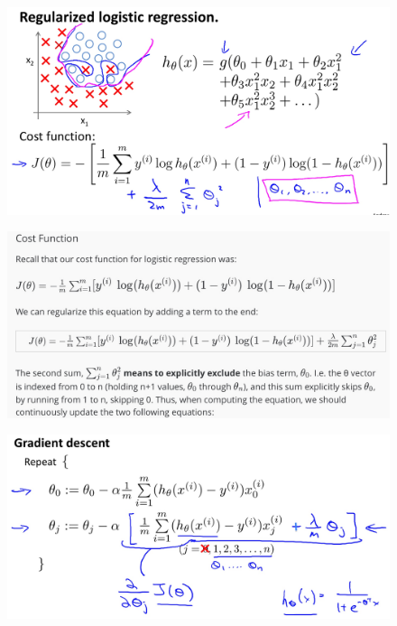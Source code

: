 \documentclass[12pt, A4,onecolumn]{article} %
\begin{document}
\begin{figure}[H]
	\centering
	\includegraphics[width=1\textwidth]{./Imagenes/regulLogicReg2}
\end{figure}

\begin{figure}[H]
	\centering
	\includegraphics[width=1\textwidth]{./Imagenes/regulLogicReg3}
\end{figure}

\begin{figure}[H]
	\centering
	\includegraphics[width=1\textwidth]{./Imagenes/regulLogicReg4}
\end{figure}
\end{document}
